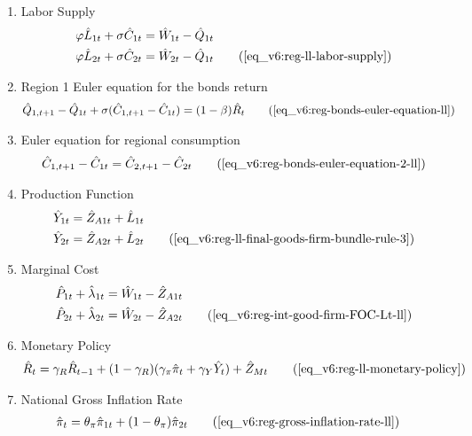 \documentclass[../thesis.tex]{subfiles}
\begin{document}
{\begin{enumerate}
	\item Labor Supply
	\begin{alignat}{2}
		\varphi \hat{L}_{1 t} + \sigma \hat{C}_{1 t} &= \hat{W}_{1 t} - \hat{Q}_{1t} \nonumber \\
		\varphi \hat{L}_{2 t} + \sigma \hat{C}_{2 t} &= \hat{W}_{2 t} - \hat{Q}_{1t} \tag{\ref{eq_v6:reg-ll-labor-supply}}
	\end{alignat}
	
	\item Region 1 Euler equation for the bonds return
	\begin{align}
		\hat{Q}_{1, t+1} - \hat{Q}_{1t} + \sigma (\hat{C}_{1, t+1} - \hat{C}_{1t}) &= (1 - \beta) \hat{R}_{t} \tag{\ref{eq_v6:reg-bonds-euler-equation-ll}}
	\end{align}
	
	\item Euler equation for regional consumption
	\begin{align}
		\hat{C}_{1, t+1} - \hat{C}_{1t} = \hat{C}_{2, t+1} - \hat{C}_{2t} \tag{\ref{eq_v6:reg-bonds-euler-equation-2-ll}}
	\end{align}
	
	\item Production Function
	\begin{align}
		\hat{Y}_{1 t} &= \hat{Z}_{A1 t} + \hat{L}_{1 t} \nonumber \\
		\hat{Y}_{2 t} &= \hat{Z}_{A2 t} + \hat{L}_{2 t} \tag{\ref{eq_v6:reg-ll-final-goods-firm-bundle-rule-3}} 
	\end{align}
	
	\item Marginal Cost
	\begin{align}
		\hat{P}_{1 t} + \hat{\lambda}_{1 t} &= \hat{W}_{1 t} - \hat{Z}_{A1 t} \nonumber \\
		\hat{P}_{2 t} + \hat{\lambda}_{2 t} &= \hat{W}_{2 t} - \hat{Z}_{A2 t} \tag{\ref{eq_v6:reg-int-good-firm-FOC-Lt-ll}}
	\end{align}
	
	\item Monetary Policy
	\begin{align}
		\hat{R}_t = \gamma_{R} \hat{R}_{t-1} + (1-\gamma_{R})(\gamma_{\pi} \hat{\pi}_t + \gamma_{Y} \hat{Y}_t) + \hat{Z}_{Mt} \tag{\ref{eq_v6:reg-ll-monetary-policy}}
	\end{align}
	
	\item National Gross Inflation Rate
	\begin{align}
		\hat{\pi}_{t} &= \theta_{\pi} \hat{\pi}_{1t} + (1 - \theta_{\pi}) \hat{\pi}_{2t} \tag{\ref{eq_v6:reg-gross-inflation-rate-ll}}
	\end{align}
	

\end{enumerate}}
\end{document}
